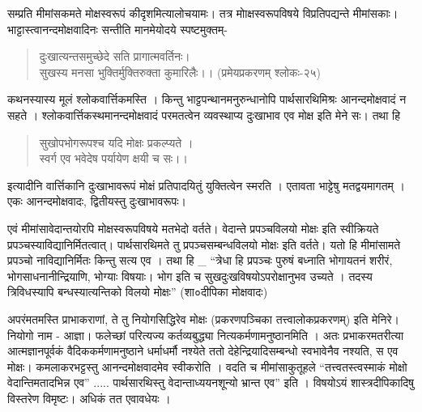सम्प्रति मीमांसकमते मोक्षस्वरूपं कीदृशमित्यालोचयामः। तत्र मोाक्षस्वरूपविषये विप्रतिपद्यन्ते मीमांसकाः। भाट्टास्त्वानन्दमोक्षवादिनः सन्तीति मानमेयोदये स्पष्टमुक्तम्-
\begin{verse}
दुःखात्यन्तसमुच्छेदे सति प्रागात्मवर्तिनः।\\
सुखस्य मनसा भुक्तिर्मुक्तिरुक्ता कुमारिलैः।। (प्रमेयप्रकरणम् श्लोकः-२५)
\end{verse}
कथनस्यास्य मूलं श्लोकवार्त्तिकमस्ति । किन्तु भाट्टपन्थानमनुरुन्धानोपि पार्थसारथिमिश्रः आनन्दमोक्षवादं न सहते । श्लोकवार्त्तिकस्थमानन्दमोक्षवादं परमतत्वेन व्यवस्थाप्य दुःखाभाव एव मोक्ष इति मेने सः। तथा हि
\begin{verse}
सुखोपभोगरूपश्च यदि मोक्षः प्रकल्प्यते ।\\
स्वर्ग एव भवेदेष पर्यायेण क्षयी च सः।।
\end{verse}
इत्यादीनि वार्त्तिकानि दुःखाभावरूपं मोक्षं प्रतिपादयितुं युक्तित्वेन स्मरति । एतावता भाट्टेषु मतद्वयमागतम् । एकः आनन्दमोक्षवादः, द्वितीयस्तु दुःखाभावरूपः।

एवं मीमांसावेदान्तयोरपि मोक्षस्वरूपविषये मतभेदो वर्तते। वेदान्ते प्रपञ्चविलयो मोक्षः इति स्वीक्रियते प्रपञ्चस्याविद्यानिर्मितत्वात्। पार्थसारथिमते तु प्रपञ्चसम्बन्धविलयो मोक्षः इति वर्तते। यतो हि मीमांसामते प्रपञ्चो नाविद्यानिर्मितः किन्तु सत्य एव । तथा हि \_ “त्रेधा हि प्रपञ्चः पुरुषं बध्नाति भोगायतनं  शरीरं, भोगसाधनानीन्द्रियाणि, भोग्याः विषयाः। भोग इति च सुखदुःखविषयोऽपरोक्षानुभव उच्यते । तदस्य त्रिविधस्यापि बन्धस्यात्यन्तिको विलयो मोक्षः” (शा०दीपिका मोक्षवादः)

अपरंमतमस्ति प्राभाकराणां, ते तु नियोगसिद्धिरेव मोक्षः (प्रकरणपञ्चिका तत्त्वालोकप्रकरणम्) इति मेनिरे। नियोगो नाम - आज्ञा। फलेच्छां परित्यज्य कर्तव्यबुद्ध्या नित्यकर्मणामनुष्ठानमिति । अतः प्रभाकरमतरीत्या आत्मज्ञानपूर्वकं वैदिककर्मणामनुष्ठाने धर्माधर्मौ नश्येते ततो देहेन्द्रियादिसम्बन्धो स्वभावेनैव नश्यति, स एव मोक्षः। कमलाकरभट्टस्तु आनन्दमोक्षवादमेव स्वीकरोति । वदति च मीमांसाकुतूहले “तत्त्वतस्त्वस्माकं मोक्षो वेदान्तिमतादभिन्न एव” ..... पार्थसारथिस्तु वेदान्ताध्ययनशून्यो भ्रान्त एव” इति । विषयोऽयं शास्त्रदीपिकादिषु विस्तरेण विमृष्टः। अधिकं तत एवावधेयः ।


